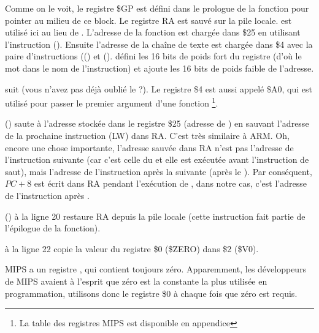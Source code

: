 

Comme on le voit, le registre \$GP est défini dans le prologue de la fonction
pour pointer au milieu de ce block.
Le registre \ac{RA} est sauvé sur la pile locale.
\puts est utilisé ici au lieu de \printf.
L'adresse de la fonction \puts est chargée dans \$25 en utilisant l'instruction  ().
Ensuite l'adresse de la chaîne de texte est chargée dans \$4 avec la paire
d'instructions  (() et 
().
 défini les 16 bits de poids fort du registre (d'où le mot 
dans le nom de l'instruction) et  ajoute les 16 bits de poids faible
de l'adresse.

 suit  (vous n'avez pas déjà oublié le  ?).
Le registre \$4 est aussi appelé \$A0, qui est utilisé pour passer le premier
argument d'une fonction \footnote{La table des registres MIPS est disponible en
appendice }.


 () saute à l'adresse stockée dans le registre
\$25 (adresse de \puts) en sauvant l'adresse de la prochaine instruction (LW)
dans \ac{RA}.
C'est très similaire à ARM.
Oh, encore une chose importante, l'adresse sauvée dans \ac{RA} n'est pas
l'adresse de l'instruction suivante (car c'est celle du  et
elle est exécutée avant l'instruction de saut), mais l'adresse de l'instruction
après la suivante (après le ).
Par conséquent, $PC + 8$ est écrit dans \ac{RA} pendant l'exécution de ,
dans notre cas, c'est l'adresse de l'instruction  après .

 () à la ligne 20 restaure \ac{RA} depuis la pile locale
(cette instruction fait partie de l'épilogue de la fonction).


 à la ligne 22 copie la valeur du registre \$0 (\$ZERO) dans \$2 (\$V0).
\label{MIPS_zero_register}

MIPS a un registre , qui contient toujours zéro.
Apparemment, les développeurs de MIPS avaient à l'esprit que zéro est la constante
la plus utilisée en programmation, utilisons donc le registre \$0 à chaque fois
que zéro est requis.

